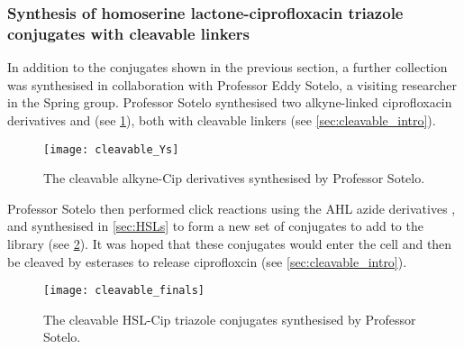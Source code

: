\subsubsection{Synthesis of homoserine lactone-ciprofloxacin triazole conjugates with cleavable linkers\label{sec:cleavable}}

%
%

In addition to the conjugates shown in the previous section, a further collection was synthesised in collaboration with Professor Eddy Sotelo, a visiting researcher in the Spring group. Professor Sotelo synthesised two alkyne-linked ciprofloxacin derivatives  and  (see \ref{fig:cleavable_Ys}), both with cleavable linkers (see \ref{sec:cleavable_intro}). 

\begin{figure}[H]
	\begin{center}
		\texttt{[image: cleavable\_Ys]}
		\caption{
			The cleavable alkyne-Cip derivatives synthesised by Professor Sotelo.
			\label{fig:cleavable_Ys}}
	\end{center}
\end{figure}

Professor Sotelo then performed click reactions using the AHL azide derivatives ,  and  synthesised in \ref{sec:HSLs} to form a new set of conjugates to add to the library (see \ref{fig:cleavable_finals}). It was hoped that these conjugates would enter the cell and then be cleaved by esterases to release ciprofloxcin (see \ref{sec:cleavable_intro}).

\begin{figure}[H]
	\begin{center}
		\texttt{[image: cleavable\_finals]}
		\caption{
			The cleavable HSL-Cip triazole conjugates synthesised by Professor Sotelo.
			\label{fig:cleavable_finals}}
	\end{center}
\end{figure}

